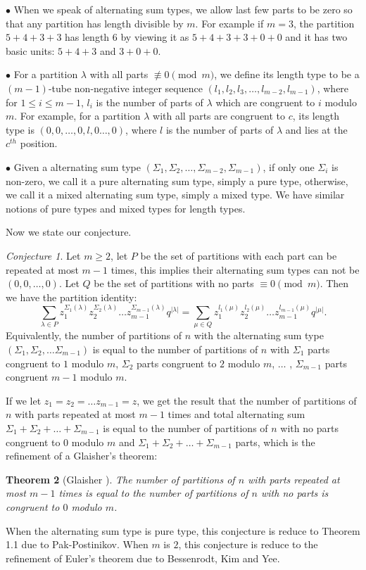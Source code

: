 \documentclass[draft]{amsart}
\numberwithin{equation}{section}
\theoremstyle{plain}
\newtheorem{theorem}{Theorem}[section]
\theoremstyle{remark}
\newtheorem{conjecture}[theorem]{Conjecture}
\begin{document}
$\bullet$ When we speak of alternating sum types, we allow last few parts to be zero so that any partition has length divisible by $m$. For example if $m=3$, the partition $5+4+3+3$ has length $6$ by viewing it as $5+4+3+3+0+0$ and it has two basic units: $5+4+3$ and $3+0+0.$

$\bullet$ For a partition $\lambda$ with all parts $\not\equiv 0\pmod m$, we define its length type to be a $(m-1)$-tube non-negative
integer sequence $(l_{1}, l_{2}, l_{3}, \dots, l_{m-2},  l_{m-1})$, where for $1\leq i\leq m-1$,  $l_{i}$ is the number of parts
of $\lambda$ which are congruent to $i$ modulo $m$. For example, for a partition $\lambda$ with all parts are congruent to $c$, its length type is $(0,0,\dots,0,l,0\dots,0)$, where $l$ is the number of parts of $\lambda$ and lies at the $c^{th}$ position.

$\bullet$ Given a alternating sum type $(\Sigma_{1},\Sigma_{2}, \dots,\Sigma_{m-2}, \Sigma_{m-1})$, if only one $\Sigma_{i}$ is non-zero, we call it a pure alternating sum type, simply a pure type, otherwise, we call it a mixed alternating sum type, simply a mixed type. We have  similar notions of pure types and mixed types for length types.

Now we state our conjecture.
\begin{conjecture}
Let $m\geq 2$,  let $P$ be the set of  partitions with each part can be repeated at most $m-1$ times, this implies their alternating sum types can not be $(0,0,\dots,0)$. Let $Q$ be the set of partitions with no parts $\equiv 0\pmod m$. Then we have
the partition identity:
$$
\sum_{\lambda \in P} z_{1}^{\Sigma_{1}(\lambda)}  z_{2}^{\Sigma_{2}(\lambda)      }  \dots z_{m-1} ^{\Sigma_{m-1}(\lambda)          }  q^{|\lambda |}      =        \sum_{\mu \in Q} z_{1}^{l_{1}(\mu)}  z_{2}^{l_{2}(\mu)      }  \dots z_{m-1} ^{l_{m-1}(\mu)          }  q^{|\mu |}.   
 $$
Equivalently,  the number of partitions  of $n$ with the alternating sum type $(\Sigma_{1}, \Sigma_{2}, \dots \Sigma_{m-1})$
is equal to the number of partitions of $n$ with $\Sigma_{1}$ parts congruent to $1$ modulo $m$, $\Sigma_{2}$ parts congruent to $2$ modulo $m$, $\dots$ , $\Sigma_{m-1}$ parts congruent $m-1$ modulo $m$.
\end{conjecture}

 If we let $z_{1}=z_{2}=\dots z_{m-1}=z$, we get the result that the number of partitions of $n$ with parts repeated at most
 $m-1$ times and total alternating sum $\Sigma_{1}+\Sigma_{2}+\dots +\Sigma_{m-1}$ is equal to the number of partitions
 of $n$ with no parts congruent to $0$ modulo $m$  and $\Sigma_{1}+\Sigma_{2}+\dots +\Sigma_{m-1}$ parts, which  is the refinement of a Glaisher's theorem:
\begin{theorem}[Glaisher \cite{Pak}]
The number of partitions of $n$ with parts repeated  at most $m-1$ times is equal to the number of partitions of $n$ with no
parts is congruent to $0$ modulo $m$.
\end{theorem}
When the alternating sum type is pure type, this conjecture is reduce to Theorem 1.1 due to Pak-Postinikov.
When $m$ is $2$, this conjecture is reduce to the refinement of Euler's theorem due to Bessenrodt, Kim and Yee.
\end{document}

